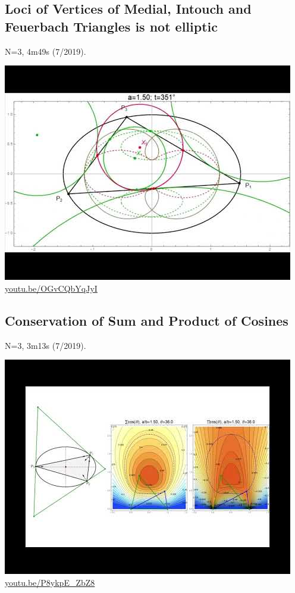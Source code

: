 \documentclass[12pt]{amsart}
\begin{document}
\subsection{Loci of Vertices of Medial, Intouch and Feuerbach Triangles is not elliptic}
\label{vid:OGvCQbYqJyI}
\noindent N=3, 4m49s (7/2019). 
\begin{center}\includegraphics[width=.5\textwidth]{pics/OGvCQbYqJyI.jpg} \\ 
\href{https://youtu.be/OGvCQbYqJyI}{\url{youtu.be/OGvCQbYqJyI}}\end{center}
% 

\subsection{Conservation of Sum and Product of Cosines}
\label{vid:P8ykpE_ZbZ8}
\noindent N=3, 3m13s (7/2019). 
\begin{center}\includegraphics[width=.5\textwidth]{pics/P8ykpE_ZbZ8.jpg} \\ 
\href{https://youtu.be/P8ykpE_ZbZ8}{\url{youtu.be/P8ykpE\_ZbZ8}}\end{center}
% 
\end{document}
